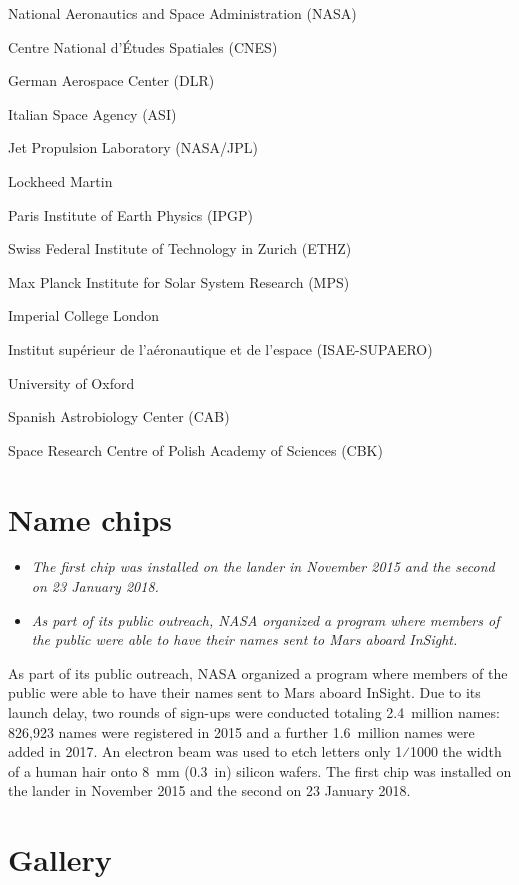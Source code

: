 National Aeronautics and Space Administration (NASA)

Centre National d'Études Spatiales (CNES)

German Aerospace Center (DLR)

Italian Space Agency (ASI)

Jet Propulsion Laboratory (NASA/JPL)

Lockheed Martin

Paris Institute of Earth Physics (IPGP)

Swiss Federal Institute of Technology in Zurich (ETHZ)

Max Planck Institute for Solar System Research (MPS)

Imperial College London

Institut supérieur de l'aéronautique et de l'espace (ISAE-SUPAERO)

University of Oxford

Spanish Astrobiology Center (CAB)

Space Research Centre of Polish Academy of Sciences (CBK)

\section{Name chips}\label{name-chips}

\begin{itemize}
\item
  \emph{The first chip was installed on the lander in November 2015 and
  the second on 23 January 2018.}
\item
  \emph{As part of its public outreach, NASA organized a program where
  members of the public were able to have their names sent to Mars
  aboard InSight.}
\end{itemize}

As part of its public outreach, NASA organized a program where members
of the public were able to have their names sent to Mars aboard InSight.
Due to its launch delay, two rounds of sign-ups were conducted totaling
2.4~million names: 826,923 names were registered in 2015 and a further
1.6~million names were added in 2017. An electron beam was used to etch
letters only ​1⁄1000 the width of a human hair onto 8~mm (0.3~in)
silicon wafers. The first chip was installed on the lander in November
2015 and the second on 23 January 2018.

\section{Gallery}\label{gallery}

